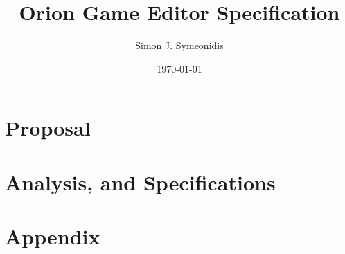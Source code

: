 \documentclass[twoside,12pt]{book}
\title{Orion Game Editor Specification}
\author{Simon J. Symeonidis}
\date{\today}
\begin{document}

\pagestyle{fancy}
\maketitle
\newpage
\rhead[]{\textbf{\color{psyan}\nouppercase{\rightmark}}}
\lhead[\textbf{\color{psyan}\nouppercase{\leftmark}}]{}

\newpage
\setcounter{tocdepth}{3}
\tableofcontents
\listoffigures
\newpage


\rfoot[]{\thepage}
\cfoot{}
\lfoot[\thepage]{}

\chapter{Proposal}



\chapter{Analysis, and Specifications}




\chapter{Appendix}


\begingroup
\raggedright


\endgroup
\end{document}
